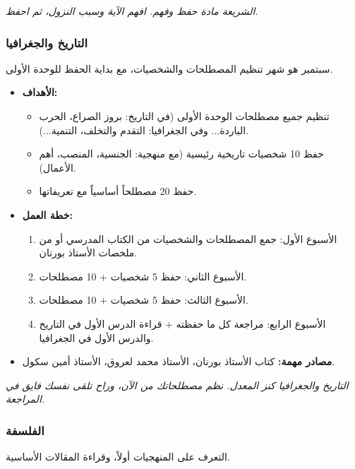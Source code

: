 \documentclass[12pt,a4paper]{book}
\newcommand{\quoteAr}[1]{%
	\begin{myquote}
		\itshape #1
	\end{myquote}
}
\begin{document}
	\quoteAr{الشريعة مادة حفظ وفهم. افهم الآية وسبب النزول، ثم احفظ.}
	
	\subsubsection{التاريخ والجغرافيا}
	
	سبتمبر هو شهر تنظيم المصطلحات والشخصيات، مع بداية الحفظ للوحدة الأولى.
	
	\begin{itemize}
		\item \textbf{الأهداف:}
		\begin{itemize}
			\item تنظيم جميع مصطلحات الوحدة الأولى (في التاريخ: بروز الصراع، الحرب الباردة... وفي الجغرافيا: التقدم والتخلف، التنمية...).
			\item حفظ 10 شخصيات تاريخية رئيسية (مع منهجية: الجنسية، المنصب، أهم الأعمال).
			\item حفظ 20 مصطلحاً أساسياً مع تعريفاتها.
		\end{itemize}
		\item \textbf{خطة العمل:}
		\begin{enumerate}
			\item الأسبوع الأول: جمع المصطلحات والشخصيات من الكتاب المدرسي أو من ملخصات الأستاذ بورنان.
			\item الأسبوع الثاني: حفظ 5 شخصيات + 10 مصطلحات.
			\item الأسبوع الثالث: حفظ 5 شخصيات + 10 مصطلحات.
			\item الأسبوع الرابع: مراجعة كل ما حفظته + قراءة الدرس الأول في التاريخ والدرس الأول في الجغرافيا.
		\end{enumerate}
		\item \textbf{مصادر مهمة:} كتاب الأستاذ بورنان، الأستاذ محمد لعروق، الأستاذ أمين سكول.
	\end{itemize}
	
	\quoteAr{التاريخ والجغرافيا كنز المعدل. نظم مصطلحاتك من الآن، وراح تلقى نفسك فايق في المراجعة.}
	
	\subsubsection{الفلسفة}
	
	التعرف على المنهجيات أولاً، وقراءة المقالات الأساسية.
	
\end{document}
